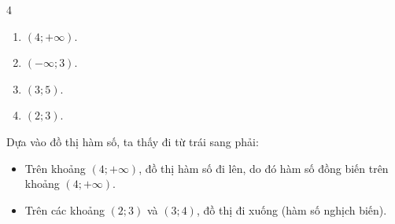 \begin{baitap}
\begin{center}
\begin{tikzpicture}[line cap=round, line join=round, >=stealth, scale=0.5]
		\end{tikzpicture}
	\end{center}
	\begin{multicols}{4}
		\begin{enumerate}
			\item $(4; +\infty)$.
			\item $(-\infty; 3)$.
			\item $(3; 5)$.
			\item $(2; 3)$.
		\end{enumerate}
	\end{multicols}
	\begin{traloi}
		Dựa vào đồ thị hàm số, ta thấy đi từ trái sang phải:
		\begin{itemize}
			\item Trên khoảng $(4; +\infty)$, đồ thị hàm số đi lên, do đó hàm số đồng biến trên khoảng $(4; +\infty)$.
		\item Trên các khoảng $(2; 3)$ và $(3; 4)$, đồ thị đi xuống (hàm số nghịch biến).
		\end{itemize}
	\end{traloi}
\end{baitap}

